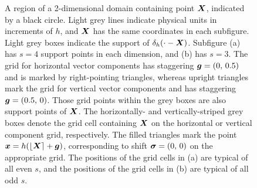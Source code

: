 \begin{figure}[t]
    \caption{%
A region of a 2-dimensional domain containing point $\boldsymbol{X}$, indicated by a black
circle. Light grey lines indicate physical units in increments of $h$, and $\boldsymbol{X}$
has the same coordinates in each subfigure. Light grey boxes indicate the
support of $\delta_h(\cdot-\boldsymbol{X})$. Subfigure (a) has $s=4$ support points in each
dimension, and (b) has $s=3$. The grid for horizontal vector components has
staggering $\boldsymbol{g}=(0,\,0.5)$ and is marked by right-pointing triangles, whereas
upright triangles mark the grid for vertical vector components and has
staggering $\boldsymbol{g}=(0.5,\,0)$. Those grid points within the grey boxes are also
support points of $\boldsymbol{X}$. The horizontally- and vertically-striped grey boxes
denote the grid cell containing $\boldsymbol{X}$ on the horizontal or vertical component
grid, respectively. The filled triangles mark the point $\boldsymbol{x}=h(\left\lfloor{\boldsymbol{X}}\right\rceil+\boldsymbol{g})$,
corresponding to shift $\boldsymbol{\sigma}=(0,\,0)$ on the appropriate grid. The positions
of the grid cells in (a) are typical of all even $s$, and the positions of the
grid cells in (b) are typical of all odd $s$.
    }
    \label{fig:grid}
\end{figure}

